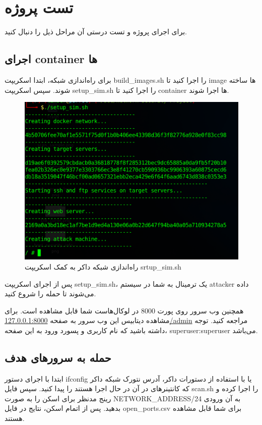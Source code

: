 \documentclass[11pt]{article}
\begin{document}
\section{تست پروژه}
برای اجرای پروژه و تست درستی آن مراحل ذیل را دنبال کنید.

\subsection{اجرای container ها}
برای راه‌اندازی شبکه، ابتدا اسکریپت build\_images.sh را اجرا کنید تا image ها ساخته شوند. سپس اسکریپت setup\_sim.sh را اجرا کنید تا container ها اجرا شوند.

\begin{figure}[hbtp]
\caption{راه‌اندازی شبکه داکر به کمک اسکریپت srtup\_sim.sh}
\centering
\includegraphics[scale=0.2]{images/setup_sim.png}
\end{figure}


پس از اجرای اسکریپت setup\_sim.sh، یک ترمینال به شما در سیستم attacker داده می‌شوند تا حمله را شروع کنید.


همچنین وب سرور روی پورت 8000 در لوکال‌هاست شما قابل مشاهده است. برای مشاهده دیتابیس این وب سرور به صفحه \url{127.0.0.1:8000/admin} مراجعه کنید. توجه داشته باشید که نام کاربری و پسورد ورود به این صفحه، superuser:superuser می‌باشد.


\subsection{حمله به سرورهای هدف}
ابتدا با اجرای دستور ifconfig یا با استفاده از دستورات داکر، آدرس نتورک شبکه داکر که کانتینرهای در آن در حال اجرا هستند را پیدا کنید. سپس فایل scan.sh را اجرا کرده و رینج مدنظر برای اسکن را به صورت NETWORK\_ADDRESS/24 به آن ورودی بدهید. پس از اتمام اسکن، نتایج در فایل open\_ports.csv برای شما قابل مشاهده هستند.
\end{document}
